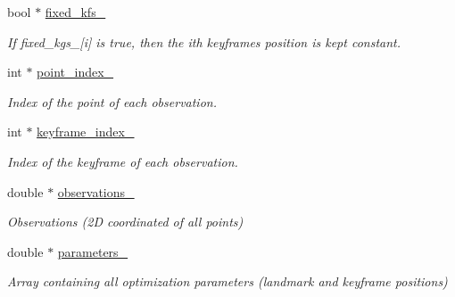 \begin{DoxyCompactItemize}
\mbox{\label{classBALProblem_a95170f7decfb90ac5ef8e6232c68bebf}} 
bool $\ast$ \hyperlink{classBALProblem_a95170f7decfb90ac5ef8e6232c68bebf}{fixed\+\_\+kfs\+\_\+}
\begin{DoxyCompactList}\small\item\em If fixed\+\_\+kgs\+\_\+\mbox{[}i\mbox{]} is true, then the ith keyframe\textquotesingle{}s position is kept constant. \end{DoxyCompactList}\item 
\mbox{\label{classBALProblem_a1ed337b74232331dffb9442a28989dda}} 
int $\ast$ \hyperlink{classBALProblem_a1ed337b74232331dffb9442a28989dda}{point\+\_\+index\+\_\+}
\begin{DoxyCompactList}\small\item\em Index of the point of each observation. \end{DoxyCompactList}\item 
\mbox{\label{classBALProblem_a86be22d2f1d63bbc41a55df8ad2bfd79}} 
int $\ast$ \hyperlink{classBALProblem_a86be22d2f1d63bbc41a55df8ad2bfd79}{keyframe\+\_\+index\+\_\+}
\begin{DoxyCompactList}\small\item\em Index of the keyframe of each observation. \end{DoxyCompactList}\item 
\mbox{\label{classBALProblem_a4fc62a548af2b622ccc5c2f827f05184}} 
double $\ast$ \hyperlink{classBALProblem_a4fc62a548af2b622ccc5c2f827f05184}{observations\+\_\+}
\begin{DoxyCompactList}\small\item\em Observations (2D coordinated of all points) \end{DoxyCompactList}\item 
\mbox{\label{classBALProblem_a4a3738ac41f84f7cb83d225e7affc821}} 
double $\ast$ \hyperlink{classBALProblem_a4a3738ac41f84f7cb83d225e7affc821}{parameters\+\_\+}
\begin{DoxyCompactList}\small\item\em Array containing all optimization parameters (landmark and keyframe positions) \end{DoxyCompactList}\item 
\mbox{\label{classBALProblem_a913fc7e394e953605eb8fd4eabdba27f}} 

\end{DoxyCompactItemize}
